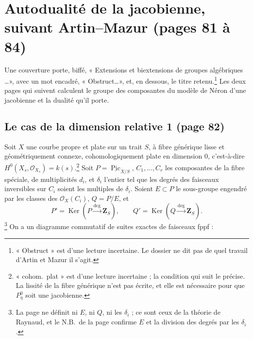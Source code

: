 \documentclass[11pt,a4paper]{article}
\begin{document}
\section*{Autodualité de la jacobienne, suivant Artin--Mazur (pages 81 à 84)}

Une couverture porte, biffé, « Extensions et biextensions de groupes
algébriques \ldots », avec un mot encadré, « Obstruct\ldots », et, en dessous, le
titre retenu.\footnote{« Obstruct » est d'une lecture incertaine. Le dossier ne dit
pas de quel travail d'Artin et Mazur il s'agit.} Les deux pages qui suivent
calculent le groupe des composantes du modèle de Néron d'une jacobienne et la
dualité qu'il porte.

\subsection*{Le cas de la dimension relative 1 (page 82)}

Soit $X$ une courbe propre et plate sur un trait $S$, à fibre générique lisse et
géométriquement connexe, cohomologiquement plate en dimension 0, c'est-à-dire
$H^0(X_s, \mathcal{O}_{X_s}) = k(s)$.\footnote{« cohom.\ plat » est d'une lecture
incertaine ; la condition qui suit le précise. La lissité de la fibre générique
n'est pas écrite, et elle est nécessaire pour que $P^0_\eta$ soit une jacobienne.}
Soit $P = \underline{\operatorname{Pic}}_{X/S}$, $C_1, \ldots, C_r$ les
composantes de la fibre spéciale, de multiplicités $d_i$, et $\delta_i$ l'entier
tel que les degrés des faisceaux inversibles sur $C_i$ soient les multiples de
$\delta_i$. Soient $E \subset P$ le sous-groupe engendré par les classes des
$\mathcal{O}_X(C_i)$, $Q = P/E$, et
\[ P' = \operatorname{Ker}(P \xrightarrow{\deg} \mathbf{Z}_S), \qquad Q' =
\operatorname{Ker}(Q \xrightarrow{\deg} \mathbf{Z}_S) . \]
\footnote{La page ne définit ni $E$, ni $Q$, ni les $\delta_i$ ; ce sont ceux de la théorie de
Raynaud, et le N.B.\ de la page confirme $E$ et la division des degrés par les $\delta_i$.} On a un diagramme commutatif de
suites exactes de faisceaux fppf :

\end{document}
